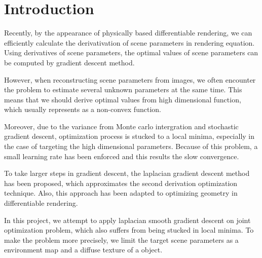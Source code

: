 \section*{Introduction}\label{ch:ch1label}

Recently, by the appearance of physically based differentiable rendering, we can efficiently calculate the derivativation of scene parameters in rendering equation. Using derivatives of scene parameters, the optimal values of scene parameters can be computed by gradient descent method. 

However, when reconstructing scene parameters from images, we often encounter the problem to estimate several unknown parameters at the same time. This means that we should derive optimal values from high dimensional function, which usually represents as a non-convex function.

Moreover, due to the variance from Monte carlo intergration and stochastic gradient descent, optimization process is stucked to a local minima, especially in the case of targeting the high dimensional parameters. Because of this problem, a small learning rate has been enforced and this results the slow convergence.

To take larger steps in gradient descent, the laplacian gradient descent method has been proposed, which approximates the second derivation optimization technique\cite{osher2018laplacian}.
Also, this approach has been adapted to optimizing geometry in differentiable rendering\cite{Nicolet2021Large}.

In this project, we attempt to apply laplacian smooth gradient descent on joint optimization problem, which also suffers from being stucked in local minima. To make the problem more precisely, we limit the target scene parameters as a environment map and a diffuse texture of a object.
